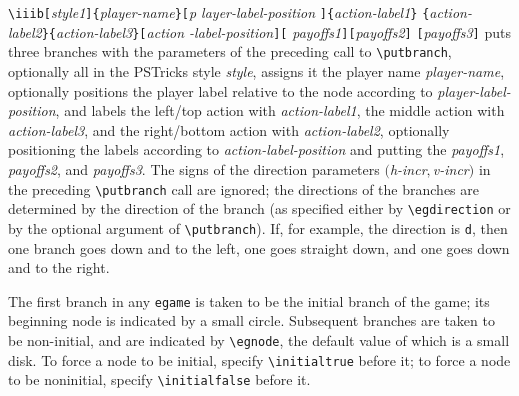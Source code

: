 \documentclass[12pt]{article}
\begin{document}
\noindent\verb+\iiib[+\emph{style1}\verb+]{+\emph{player-name}\verb+}[+\emph{p%
layer-label-position}%
\verb+]{+\emph{action-label1}\verb+}+\newline
\verb+{+\emph{action-label2}\verb+}{+\emph{action-label3}\verb+}[+\emph{action%
-label-position}\verb+][+%
\emph{payoffs1}\verb+][+\emph{payoffs2}\verb+]+\newline
\verb+[+\emph{payoffs3}{\tt ]}\newline
\noindent puts three branches with the parameters of the preceding call to
\verb+\putbranch+, optionally all in the PSTricks style \emph{style}, assigns
it the player name \emph{player-name}, optionally positions the player label
relative to the node according to \emph{player-label-position}, and labels the
left/top action with \emph{action-label1}, the middle action with
\emph{action-label3}, and the right/bottom action with \emph{action-label2},
optionally positioning the labels according to \emph{action-label-position}
and putting the \emph{payoffs1}, \emph{payoffs2}, and \emph{payoffs3}.  The
signs of the direction parameters $($\emph{h-incr}$,$\emph{v-incr}$)$ in the
preceding \verb+\putbranch+ call are ignored; the directions of the branches
are determined by the direction of the branch (as specified either by
\verb+\egdirection+ or by the optional argument of \verb+\putbranch+).  If,
for example, the direction is {\tt d}, then one branch goes down and to the
left, one goes straight down, and one goes down and to the right.

The first branch in any {\tt egame} is taken to be the initial branch of the
game; its beginning node is indicated by a small circle.  Subsequent branches
are taken to be non-initial, and are indicated by \verb+\egnode+, the default
value of which is a small disk.  To force a node to be initial, specify
\verb+\initialtrue+ before it; to force a node to be noninitial, specify
\verb+\initialfalse+ before it.
\end{document}

